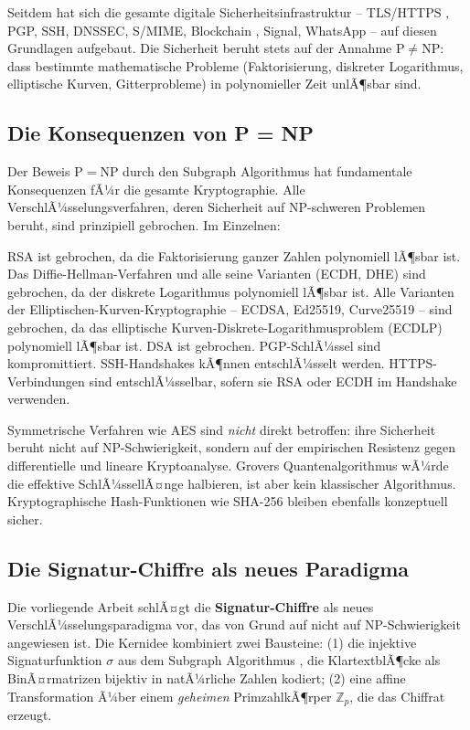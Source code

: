 ﻿\documentclass[a4paper,12pt]{scrreprt}
\theoremstyle{definition}
\begin{document}
Seitdem hat sich die gesamte digitale Sicherheitsinfrastruktur -- TLS/HTTPS \cite{Res18}, PGP, SSH, DNSSEC, S/MIME, Blockchain \cite{Nak08}, Signal, WhatsApp -- auf diesen Grundlagen aufgebaut. Die Sicherheit beruht stets auf der Annahme $\mathrm{P} \neq \mathrm{NP}$: dass bestimmte mathematische Probleme (Faktorisierung, diskreter Logarithmus, elliptische Kurven, Gitterprobleme) in polynomieller Zeit unlÃ¶sbar sind.

\subsection{Die Konsequenzen von P = NP}

Der Beweis $\mathrm{P} = \mathrm{NP}$ durch den Subgraph Algorithmus \cite{Epp26a} hat fundamentale Konsequenzen fÃ¼r die gesamte Kryptographie. Alle VerschlÃ¼sselungsverfahren, deren Sicherheit auf NP-schweren Problemen beruht, sind prinzipiell gebrochen. Im Einzelnen:

RSA \cite{Riv78} ist gebrochen, da die Faktorisierung ganzer Zahlen polynomiell lÃ¶sbar ist. Das Diffie-Hellman-Verfahren \cite{DH76} und alle seine Varianten (ECDH, DHE) sind gebrochen, da der diskrete Logarithmus polynomiell lÃ¶sbar ist. Alle Varianten der Elliptischen-Kurven-Kryptographie -- ECDSA, Ed25519, Curve25519 -- sind gebrochen, da das elliptische Kurven-Diskrete-Logarithmusproblem (ECDLP) polynomiell lÃ¶sbar ist. DSA ist gebrochen. PGP-SchlÃ¼ssel sind kompromittiert. SSH-Handshakes kÃ¶nnen entschlÃ¼sselt werden. HTTPS-Verbindungen sind entschlÃ¼sselbar, sofern sie RSA oder ECDH im Handshake verwenden.

Symmetrische Verfahren wie AES \cite{DR02} sind \emph{nicht} direkt betroffen: ihre Sicherheit beruht nicht auf NP-Schwierigkeit, sondern auf der empirischen Resistenz gegen differentielle \cite{BS93} und lineare \cite{Mat94} Kryptoanalyse. Grovers Quantenalgorithmus \cite{Gro96} wÃ¼rde die effektive SchlÃ¼ssellÃ¤nge halbieren, ist aber kein klassischer Algorithmus. Kryptographische Hash-Funktionen wie SHA-256 \cite{NIST15a} bleiben ebenfalls konzeptuell sicher.

\subsection{Die Signatur-Chiffre als neues Paradigma}

Die vorliegende Arbeit schlÃ¤gt die \textbf{Signatur-Chiffre} als neues VerschlÃ¼sselungsparadigma vor, das von Grund auf nicht auf NP-Schwierigkeit angewiesen ist. Die Kernidee kombiniert zwei Bausteine: (1) die injektive Signaturfunktion $\sigma$ aus dem Subgraph Algorithmus \cite{Epp26a}, die KlartextblÃ¶cke als BinÃ¤rmatrizen bijektiv in natÃ¼rliche Zahlen kodiert; (2) eine affine Transformation Ã¼ber einem \emph{geheimen} PrimzahlkÃ¶rper $\mathbb{Z}_p$, die das Chiffrat erzeugt.
\end{document}
